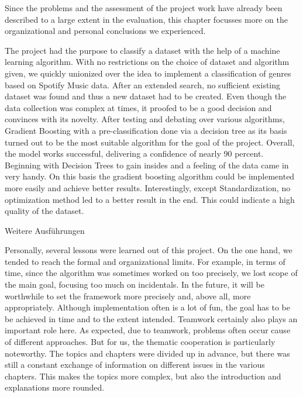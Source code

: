     

    Since the problems and the assessment of the project work have already been described to a large extent in the evaluation, 
        this chapter focusses more on the organizational and personal conclusions we experienced. 

        The project had the purpose to classify a dataset with the help of a machine learning algorithm. With no restrictions on the choice of dataset and algorithm given, 
        we quickly unionized over the idea to implement a classification of genres based on Spotify Music data. After an extended search, 
        no sufficient existing dataset was found and thus a new dataset had to be created. Even though the data collection was complex at times, 
        it proofed to be a good decision and convinces with its novelty. After testing and debating over various algorithms, Gradient Boosting with 
        a pre-classification done via a decision tree as its basis turned out to be the most suitable algorithm for the goal of the project.
        Overall, the model works successful, delivering a confidence of nearly 90 percent. Beginning with Decision Trees to gain insides and a feeling of the data came in very handy. 
        On this basis the gradient boosting algorithm could be implemented more easily and achieve better results. Interestingly, except Standardization, 
        no optimization method led to a better result in the end. This could indicate a high quality of the dataset. 
        
        Weitere Ausführungen

        Personally, several lessons were learned out of this project. On the one hand, we tended to reach the formal and organizational limits. 
        For example, in terms of time, since the algorithm was sometimes worked on too precisely, we lost scope of the main goal, focusing too much on incidentals. 
        In the future, it will be worthwhile to set the framework more precisely and, above all, more appropriately. Although implementation often is a lot of fun, 
        the goal has to be be achieved in time and to the extent intended. Teamwork certainly also plays an important role here. As expected, due to teamwork, 
        problems often occur cause of different approaches. But for us, the thematic cooperation is particularly noteworthy. The topics and chapters were divided up in advance, 
        but there was still a constant exchange of information on different issues in the various chapters. This makes the topics more complex, but also the introduction and explanations more rounded.

